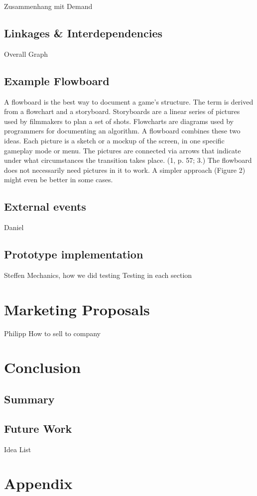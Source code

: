 \documentclass[11pt,titlepage,oneside,openany]{book}
\begin{document}
Zusammenhang mit Demand


\section{Linkages \& Interdependencies}
\label{sec:link}
Overall Graph

\section{Example Flowboard}
A flowboard is the best way to document a game’s structure. The term is derived
from a flowchart and a storyboard. Storyboards are a linear series of pictures
used by filmmakers to plan a set of shots. Flowcharts are diagrams used
by programmers for documenting an algorithm. A flowboard combines these
two ideas. Each picture is a sketch or a mockup of the screen, in one specific
gameplay mode or menu. The pictures are connected via arrows that indicate
under what circumstances the transition takes place. (1, p. 57; 3.) The flowboard
does not necessarily need pictures in it to work. A simpler approach (Figure
2) might even be better in some cases.

\section{External events}
Daniel

\section{Prototype implementation}
Steffen
Mechanics, how we did testing
Testing in each section

\chapter{Marketing Proposals}
Philipp
\label{cha:exp}
\label{sec:setting}
How to sell to company


\chapter{Conclusion}
\label{cha:conclusion}


\section{Summary}
\label{sec:sum}

\section{Future Work}
\label{sec:future}
Idea List





\appendix

\chapter{Appendix}
\label{cha:appendix-a}

\newpage


\pagestyle{empty}
\end{document}
